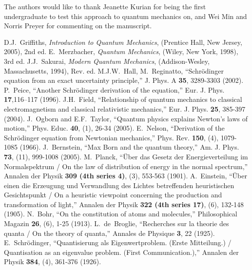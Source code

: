 \documentclass[preprint,footinbib,preprintnumbers,amsmath,amssymb,prb,12pt]{revtex4}
\begin{document}
\begin{acknowledgements}
The authors would like to thank Jeanette Kurian for being the first undergraduate to test this approach to quantum mechanics on, and Wei Min and Norris Preyer for commenting on the manuscript.
\end{acknowledgements}


\newpage
\begin{thebibliography}{}
 D.J.~Griffiths, \textit{Introduction to Quantum Mechanics}, (Prentice Hall, New Jersey, 2005), 2nd ed.
 E.~Merzbacher, \textit{Quantum Mechanics}, (Wiley, New York, 1998), 3rd ed.
 J.J.~Sakurai, \textit{Modern Quantum Mechanics}, (Addison-Wesley, Massachusetts, 1994), Rev. ed.
 M.J.W.~Hall, M.~Reginatto, ``Schr\"{o}dinger equation from an exact uncertainty principle,'' J. Phys. A \textbf{35}, 3289-3303 (2002).
 P.~Peice, ``Another Schr\"{o}dinger derivation of the equation,'' Eur. J. Phys. \textbf{17},116--117 (1996).
 J.H.~Field, ``Relationship of quantum mechanics to classical electromagnetism and classical relativistic mechanics,'' Eur. J. Phys. \textbf{25}, 385-397 (2004).
 J.~Ogborn and E.F.~Taylor, ``Quantum physics explains Newton's laws of motion,'' Phys. Educ. \textbf{40}, (1), 26-34 (2005).
 E.~Nelson, ``Derivation of the Schr\"{o}dinger equation from Newtonian mechanics,'' Phys. Rev. \textbf{150}, (4), 1079-1085 (1966).
 J.~Bernstein, ``Max Born and the quantum theory,'' Am. J. Phys. \textbf{73}, (11), 999-1008 (2005).
M.~Planck, ``{\"{U}}ber das Gesetz der Energieverteilung im Normalspektrum / On the law of distribution of energy in the normal spectrum,''  Annalen der Physik \textbf{309 (4th series 4)}, (3), 553-563 (1901).
A.~Einstein, ``{\"{U}}ber einen die Erzeugung und Verwandlung des Lichtes betreffenden heuristischen Gesichtspunkt / On a heuristic viewpoint concerning the production and transformation of light,''  Annalen der Physik \textbf{322 (4th series 17)}, (6), 132-148 (1905).
N.~Bohr, ``On the constitution of atoms and molecules,''  Philosophical Magazin \textbf{26}, (6), 1-25 (1913).
L.~de~Broglie, ``Recherches sur la theorie des quanta / On the theory of quanta,''  Annales de Physique \textbf{3},  22 (1925).
E.~Schr\"{o}dinger, ``Quantisierung als Eigenwertproblem. (Erste Mitteilung.) / Quantisation as an eigenvalue problem. (First Communication.),''  Annalen der Physik \textbf{384}, (4), 361-376 (1926).

\end{thebibliography}
\end{document}
